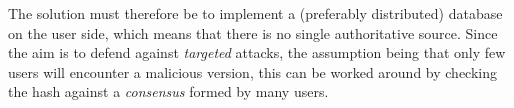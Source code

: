 




The solution must therefore be to implement a (preferably distributed) database on the user side, which means that there is no single authoritative source.
Since the aim is to defend against \emph{targeted} attacks, the assumption being that only few users will encounter a malicious version, this can be worked around by checking the hash against a \emph{consensus} formed by many users.

